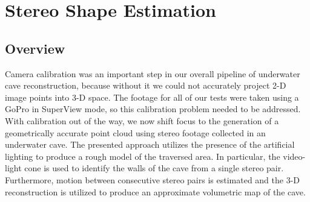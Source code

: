 \chapter{Stereo Shape Estimation}\label{chap:pcrecon}
\section{Overview}\label{sec:pcoverview}
Camera calibration was an important step in our overall pipeline of underwater cave reconstruction, because without it we could not accurately project 2\hyp D image points into 3\hyp D space. The footage for all of our tests were taken using a GoPro in SuperView mode, so this calibration problem needed to be addressed. With calibration out of the way, we now shift focus to the generation of a geometrically accurate point cloud using stereo footage collected in an underwater cave. The presented approach utilizes the presence of the artificial lighting to produce a rough model of the traversed area. In particular, the video\hyp light cone is used to identify the  walls of the cave from a single stereo pair. Furthermore, motion between consecutive stereo pairs is estimated and the 3\hyp D reconstruction is utilized to produce an approximate volumetric map of the cave.

